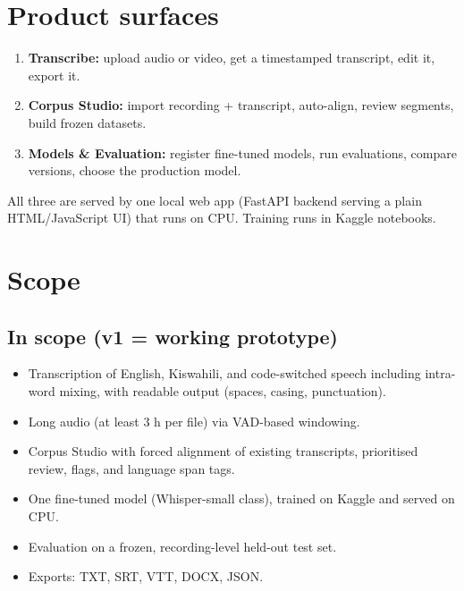 \documentclass[11pt]{article}
\begin{document}
\hypertarget{product-surfaces}{%
\section{Product surfaces}\label{product-surfaces}}

\begin{enumerate}
\def\labelenumi{\arabic{enumi}.}
\tightlist
\item
  \textbf{Transcribe:} upload audio or video, get a timestamped transcript, edit it, export it.
\item
  \textbf{Corpus Studio:} import recording + transcript, auto-align, review segments, build frozen datasets.
\item
  \textbf{Models \& Evaluation:} register fine-tuned models, run evaluations, compare versions, choose the production model.
\end{enumerate}

All three are served by one local web app (FastAPI backend serving a plain HTML/JavaScript UI) that runs on CPU. Training runs in Kaggle notebooks.

\hypertarget{scope}{%
\section{Scope}\label{scope}}

\hypertarget{in-scope-v1--working-prototype}{%
\subsection{In scope (v1 = working prototype)}\label{in-scope-v1--working-prototype}}

\begin{itemize}
\tightlist
\item
  Transcription of English, Kiswahili, and code-switched speech including intra-word mixing, with readable output (spaces, casing, punctuation).
\item
  Long audio (at least 3 h per file) via VAD-based windowing.
\item
  Corpus Studio with forced alignment of existing transcripts, prioritised review, flags, and language span tags.
\item
  One fine-tuned model (Whisper-small class), trained on Kaggle and served on CPU.
\item
  Evaluation on a frozen, recording-level held-out test set.
\item
  Exports: TXT, SRT, VTT, DOCX, JSON.
\end{itemize}
\end{document}
